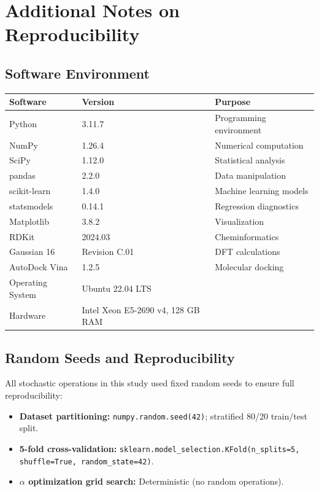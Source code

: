 \documentclass[12pt,a4paper]{article}
\begin{document}
\newpage

\section*{Additional Notes on Reproducibility}

\subsection*{Software Environment}

\begin{table}[H]
\centering
\begin{tabular}{@{}lll@{}}
\toprule
\textbf{Software} & \textbf{Version} & \textbf{Purpose} \\
\midrule
Python & 3.11.7 & Programming environment \\
NumPy & 1.26.4 & Numerical computation \\
SciPy & 1.12.0 & Statistical analysis \\
pandas & 2.2.0 & Data manipulation \\
scikit-learn & 1.4.0 & Machine learning models \\
statsmodels & 0.14.1 & Regression diagnostics \\
Matplotlib & 3.8.2 & Visualization \\
RDKit & 2024.03 & Cheminformatics \\
Gaussian 16 & Revision C.01 & DFT calculations \\
AutoDock Vina & 1.2.5 & Molecular docking \\
\midrule
Operating System & Ubuntu 22.04 LTS & \\
Hardware & Intel Xeon E5-2690 v4, 128 GB RAM & \\
\bottomrule
\end{tabular}
\end{table}

\subsection*{Random Seeds and Reproducibility}

All stochastic operations in this study used fixed random seeds to ensure full reproducibility:

\begin{itemize}[leftmargin=2em]
\item \textbf{Dataset partitioning:} \texttt{numpy.random.seed(42)}; stratified 80/20 train/test split.
\item \textbf{5-fold cross-validation:} \texttt{sklearn.model\_selection.KFold(n\_splits=5, shuffle=True, random\_state=42)}.
\item \textbf{$\alpha$ optimization grid search:} Deterministic (no random operations).
\end{itemize}
\end{document}

